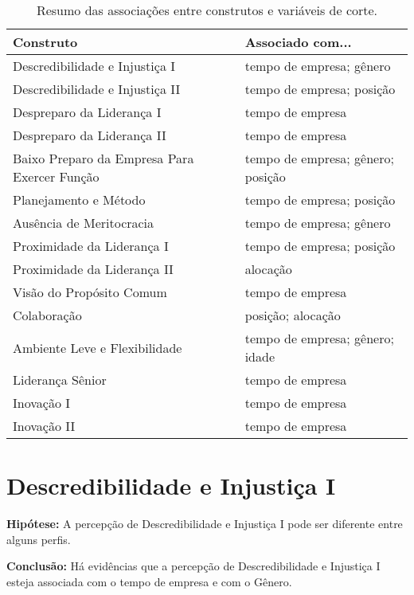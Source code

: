 \documentclass[]{book}
\begin{document}
\begin{table}[t]

\caption{\label{tab:unnamed-chunk-11}Resumo das associações entre construtos e variáveis de corte.}
\centering
\fontsize{10}{12}\selectfont
\begin{tabular}{ll}
\toprule
Construto & Associado com...\\
\midrule
Descredibilidade e Injustiça I & tempo de empresa; gênero\\
Descredibilidade e Injustiça II & tempo de empresa; posição\\
Despreparo da Liderança I & tempo de empresa\\
Despreparo da Liderança II & tempo de empresa\\
Baixo Preparo da Empresa Para Exercer Função & tempo de empresa; gênero; posição\\
\addlinespace
Planejamento e Método & tempo de empresa; posição\\
Ausência de Meritocracia & tempo de empresa; gênero\\
Proximidade da Liderança I & tempo de empresa; posição\\
Proximidade da Liderança II & alocação\\
Visão do Propósito Comum & tempo de empresa\\
\addlinespace
Colaboração & posição; alocação\\
Ambiente Leve e Flexibilidade & tempo de empresa; gênero; idade\\
Liderança Sênior & tempo de empresa\\
Inovação I & tempo de empresa\\
Inovação II & tempo de empresa\\
\bottomrule
\end{tabular}
\end{table}

\pagebreak

\hypertarget{descredibilidade-e-injustica-i}{%
\section{Descredibilidade e Injustiça I}\label{descredibilidade-e-injustica-i}}

\textbf{Hipótese:} A percepção de Descredibilidade e Injustiça I pode ser diferente entre alguns perfis.

\textbf{Conclusão:} Há evidências que a percepção de Descredibilidade e Injustiça I esteja associada com o tempo de empresa e com o Gênero.
\end{document}
